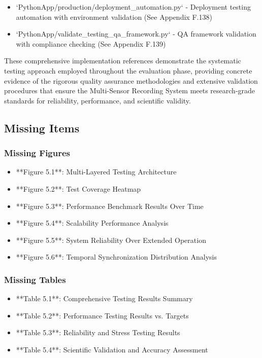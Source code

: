 \documentclass[12pt,a4paper]{article}
\begin{document}
\begin{itemize}
\item `PythonApp/production/deployment_automation.py` - Deployment testing automation with environment validation (See
  Appendix F.138)
\item `PythonApp/validate_testing_qa_framework.py` - QA framework validation with compliance checking (See Appendix F.139)

\end{itemize}
These comprehensive implementation references demonstrate the systematic testing approach employed throughout the
evaluation phase, providing concrete evidence of the rigorous quality assurance methodologies and extensive validation
procedures that ensure the Multi-Sensor Recording System meets research-grade standards for reliability, performance,
and scientific validity.

\subsection{Missing Items}

\subsubsection{Missing Figures}

\begin{itemize}
\item **Figure 5.1**: Multi-Layered Testing Architecture
\item **Figure 5.2**: Test Coverage Heatmap
\item **Figure 5.3**: Performance Benchmark Results Over Time
\item **Figure 5.4**: Scalability Performance Analysis
\item **Figure 5.5**: System Reliability Over Extended Operation
\item **Figure 5.6**: Temporal Synchronization Distribution Analysis

\end{itemize}
\subsubsection{Missing Tables}

\begin{itemize}
\item **Table 5.1**: Comprehensive Testing Results Summary
\item **Table 5.2**: Performance Testing Results vs. Targets
\item **Table 5.3**: Reliability and Stress Testing Results
\item **Table 5.4**: Scientific Validation and Accuracy Assessment

\end{itemize}
\end{document}
